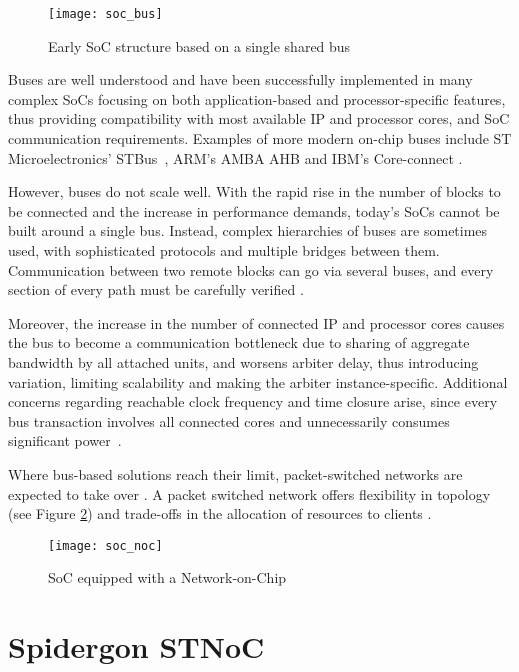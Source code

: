 	\begin{figure}[ht]
	\centering
		\texttt{[image: soc\_bus]}
		\caption{Early SoC structure based on a single shared bus}
		\label{fig:soc_bus}
	\end{figure} 

Buses are well understood and have been successfully implemented in many complex SoCs focusing on both application-based and processor-specific features, thus providing compatibility with most available IP and processor cores, and SoC communication requirements. 
Examples of more modern on-chip buses include ST Microelectronics' STBus~\cite{scandurra2002stbus}, ARM's AMBA AHB and IBM's Core-connect \cite{ryu2001comparison}.

However, buses do not scale well. With the rapid rise in the number of blocks to be connected and the
increase in performance demands, today's SoCs cannot be built around a single bus. Instead, complex hierarchies of buses are sometimes used, with sophisticated protocols and multiple bridges between them.
Communication between two remote blocks can go via several buses, and every section of every path must be carefully verified \cite{furber2005future}. 

Moreover, the increase in the number of connected IP and processor cores causes the bus to become a communication bottleneck due to sharing of aggregate bandwidth by all attached units, and worsens arbiter delay, thus introducing variation, limiting scalability and making the arbiter instance-specific. 
Additional concerns regarding reachable clock frequency and time closure arise, since every bus transaction involves all connected cores and unnecessarily consumes significant power~\cite{coppola2008design}.

Where bus-based solutions reach their limit, packet-switched networks are expected to take over \cite{dally2001route}. 
A packet switched network offers flexibility in topology (see Figure \ref{fig:soc_noc}) and trade-offs in the allocation of resources to clients \cite{furber2005future}.

	\begin{figure}[ht]
	\centering
		\texttt{[image: soc\_noc]}
		\caption{SoC equipped with a Network-on-Chip}
		\label{fig:soc_noc}
	\end{figure} 

\section{Spidergon STNoC}\label{C:stnoc}

